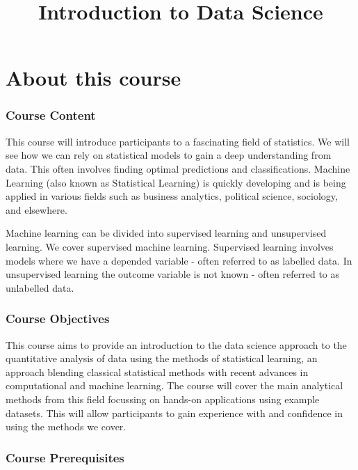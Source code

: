 \documentclass[]{article}
\title{Introduction to Data Science}
\author{}
\date{}
\begin{document}
\maketitle

{
\setcounter{tocdepth}{2}
\tableofcontents
}
\hypertarget{about-this-course}{%
\section*{About this course}\label{about-this-course}}

\hypertarget{course-content}{%
\subsubsection{Course Content}\label{course-content}}

This course will introduce participants to a fascinating field of statistics. We will see how we can rely on statistical models to gain a deep understanding from data. This often involves finding optimal predictions and classifications. Machine Learning (also known as Statistical Learning) is quickly developing and is being applied in various fields such as business analytics, political science, sociology, and elsewhere.

Machine learning can be divided into supervised learning and unsupervised learning. We cover supervised machine learning. Supervised learning involves models where we have a depended variable - often referred to as labelled data. In unsupervised learning the outcome variable is not known - often referred to as unlabelled data.

\hypertarget{course-objectives}{%
\subsubsection{Course Objectives}\label{course-objectives}}

This course aims to provide an introduction to the data science approach to the quantitative analysis of data using the methods of statistical learning, an approach blending classical statistical methods with recent advances in computational and machine learning. The course will cover the main analytical methods from this field focussing on hands-on applications using example datasets. This will allow participants to gain experience with and confidence in using the methods we cover.

\hypertarget{course-prerequisites}{%
\subsubsection{Course Prerequisites}\label{course-prerequisites}}
\end{document}
